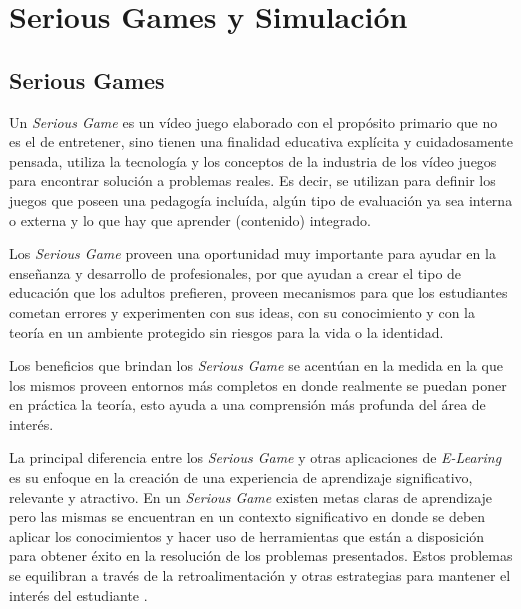 
\section{Serious Games y Simulación}

\subsection{Serious Games}

Un \emph{Serious Game} es un vídeo juego elaborado con el propósito primario que
no es el de entretener\cite{sg:aoverview}, sino tienen una finalidad educativa
explícita y cuidadosamente pensada, utiliza la tecnología y los conceptos de la
industria de los vídeo juegos para encontrar solución a problemas reales. Es
decir, se utilizan para definir los juegos que poseen una pedagogía incluída,
algún tipo de evaluación ya sea interna o externa y lo que hay que aprender
(contenido) integrado\cite{damien:sg}.

Los \emph{Serious Game} proveen una oportunidad muy importante para ayudar en
la enseñanza y desarrollo de profesionales, por que ayudan a crear el tipo de educación que los
adultos prefieren, proveen mecanismos para que los estudiantes cometan errores y
experimenten con sus ideas, con su conocimiento y con la teoría en un ambiente
protegido sin riesgos para la vida o la identidad. 

Los beneficios que brindan los \emph{Serious Game} se acentúan en la medida en
la que los mismos proveen entornos más completos en donde realmente se puedan
poner en práctica la teoría, esto ayuda a una comprensión más profunda del área
de interés.

La principal diferencia entre los \emph{Serious Game} y otras aplicaciones de
\emph{E-Learing} es su enfoque en la creación de una experiencia de aprendizaje
significativo, relevante y atractivo. En un \emph{Serious Game} existen metas
claras de aprendizaje pero las mismas se encuentran en un contexto significativo
en donde se deben aplicar los conocimientos y hacer uso de herramientas que
están a disposición para obtener éxito en la resolución de los problemas
presentados. Estos problemas se equilibran a través de la retroalimentación y
otras estrategias para mantener el interés del estudiante \cite{papertian:const}.

